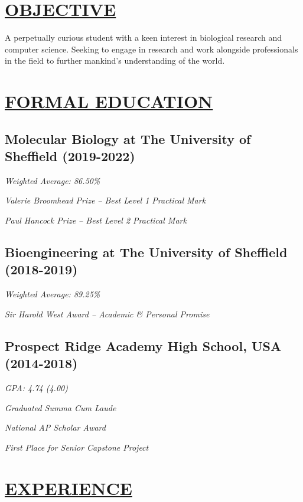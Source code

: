 \documentclass[twocolumn, a4paper, fontsize=9pt, headsepline, footsepline]{scrartcl}
\begin{document}
\onehalfspacing
{}
\setul{}{2pt}
\section*{\ul{OBJECTIVE}}
\noindent
A perpetually curious student with a keen interest in biological research and
computer science. Seeking to engage in research and work alongside professionals
in the field to further mankind's understanding of the world.

\section*{\ul{FORMAL EDUCATION}}
\subsection*{Molecular Biology at The University of Sheffield (2019-2022)}
\vspace{-5pt}
\emph{Weighted Average: 86.50\%}\par
\emph{Valerie Broomhead Prize – \emph{Best Level 1 Practical Mark}}\par
\emph{Paul Hancock Prize – \emph{Best Level 2 Practical Mark}}\par

\subsection*{Bioengineering at The University of Sheffield (2018-2019)}
\vspace{-5pt}
\emph{Weighted Average: 89.25\%}\par
\emph{Sir Harold West Award  – \emph{Academic \& Personal Promise}}

\subsection*{Prospect Ridge Academy High School, USA (2014-2018)}
\vspace{-5pt}
\emph{GPA: 4.74 (4.00)}\par
\emph{Graduated Summa Cum Laude}\par
\emph{National AP Scholar Award}\par
\emph{First Place for Senior Capstone Project}

\section*{\ul{EXPERIENCE}}
\end{document}
